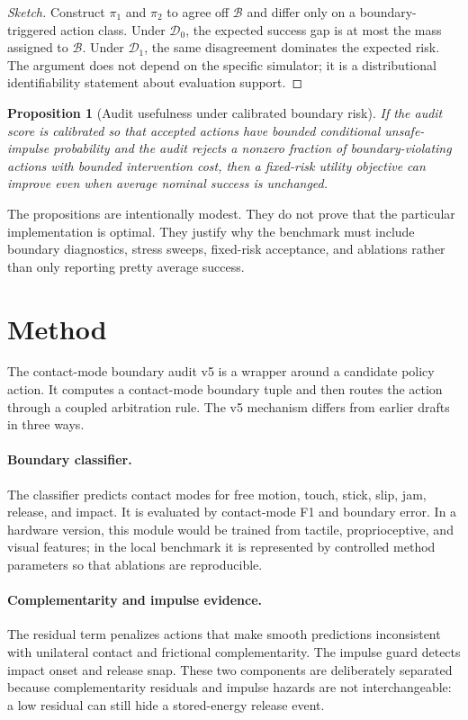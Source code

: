 \documentclass{article}
\newtheorem{proposition}{Proposition}
\newcommand{\method}{contact-mode boundary audit v5}
\begin{document}
\begin{proof}[Sketch]
Construct $\pi_1$ and $\pi_2$ to agree off $\mathcal{B}$ and differ only on a boundary-triggered action class. Under $\mathcal{D}_0$, the expected success gap is at most the mass assigned to $\mathcal{B}$. Under $\mathcal{D}_1$, the same disagreement dominates the expected risk. The argument does not depend on the specific simulator; it is a distributional identifiability statement about evaluation support.
\end{proof}

\begin{proposition}[Audit usefulness under calibrated boundary risk]
If the audit score is calibrated so that accepted actions have bounded conditional unsafe-impulse probability and the audit rejects a nonzero fraction of boundary-violating actions with bounded intervention cost, then a fixed-risk utility objective can improve even when average nominal success is unchanged.
\end{proposition}

The propositions are intentionally modest. They do not prove that the particular implementation is optimal. They justify why the benchmark must include boundary diagnostics, stress sweeps, fixed-risk acceptance, and ablations rather than only reporting pretty average success.

\section{Method}
The \method{} is a wrapper around a candidate policy action. It computes a contact-mode boundary tuple and then routes the action through a coupled arbitration rule. The v5 mechanism differs from earlier drafts in three ways.

\paragraph{Boundary classifier.}
The classifier predicts contact modes for free motion, touch, stick, slip, jam, release, and impact. It is evaluated by contact-mode F1 and boundary error. In a hardware version, this module would be trained from tactile, proprioceptive, and visual features; in the local benchmark it is represented by controlled method parameters so that ablations are reproducible.

\paragraph{Complementarity and impulse evidence.}
The residual term penalizes actions that make smooth predictions inconsistent with unilateral contact and frictional complementarity. The impulse guard detects impact onset and release snap. These two components are deliberately separated because complementarity residuals and impulse hazards are not interchangeable: a low residual can still hide a stored-energy release event.
\end{document}
